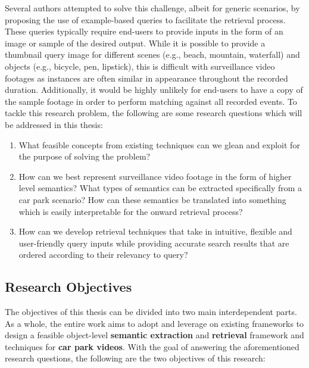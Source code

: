 Several authors attempted to solve this challenge,
albeit for generic scenarios,
by proposing the use of example-based queries \cite{zhang2017car, liu2016large, castanon2016retrieval} to facilitate the retrieval process.
These queries typically require end-users to provide inputs in the form of an image or sample of the desired output. While it is possible to provide a thumbnail query image for different scenes (e.g., beach, mountain, waterfall) and objects (e.g., bicycle, pen, lipstick), this is difficult with surveillance video footages as instances are often similar in appearance throughout the recorded duration. Additionally, it would be highly unlikely for end-users to have a copy of the sample footage in order to perform matching against all recorded events.
To tackle this research problem, the following are some research questions which will be addressed in this thesis:
\begin{enumerate}
\item What feasible concepts from existing techniques can we glean and exploit for the purpose of solving the problem?
\item How can we best represent surveillance video footage in the form of higher level semantics? What types of semantics can be extracted specifically from a car park scenario? How can these semantics be translated into something which is easily interpretable for the onward retrieval process?
\item How can we develop retrieval techniques that take in intuitive, flexible and user-friendly query inputs while providing accurate search results that are ordered according to their relevancy to query?
\end{enumerate}


\vspace{1em}
\subsection{Research Objectives}
The objectives of this thesis can be divided into two main interdependent parts. As a whole, the entire work aims to adopt and leverage on existing frameworks to design a feasible object-level \textbf{semantic extraction} and \textbf{retrieval} framework and techniques for \textbf{car park videos}. 
With the goal of answering the aforementioned research questions, the following are the two objectives of this research:

